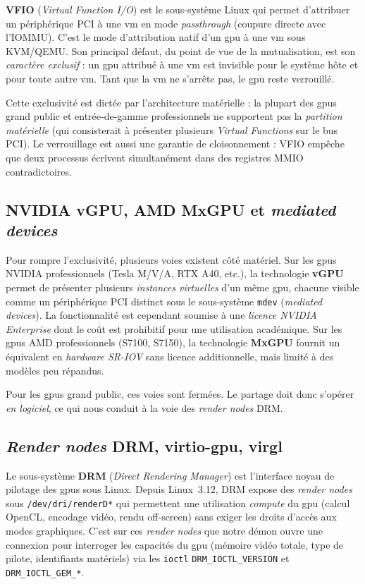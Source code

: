 \textbf{VFIO} (\emph{Virtual Function I/O}) est le sous-système Linux qui permet d'attribuer un périphérique PCI à une \acrshort{vm} en mode \emph{passthrough} (\og{}coupure\fg{} directe avec l'IOMMU). C'est le mode d'attribution natif d'un \acrshort{gpu} à une \acrshort{vm} sous KVM/QEMU. Son principal défaut, du point de vue de la mutualisation, est son \emph{caractère exclusif} : un \acrshort{gpu} attribué à une \acrshort{vm} est invisible pour le système hôte et pour toute autre \acrshort{vm}. Tant que la \acrshort{vm} ne s'arrête pas, le \acrshort{gpu} reste verrouillé.

Cette exclusivité est dictée par l'architecture matérielle : la plupart des \acrshort{gpu}s grand public et entrée-de-gamme professionnels ne supportent pas la \emph{partition matérielle} (qui consisterait à présenter plusieurs \emph{Virtual Functions} sur le bus PCI). Le verrouillage est aussi une garantie de cloisonnement : VFIO empêche que deux processus écrivent simultanément dans des registres MMIO contradictoires.

\subsection{NVIDIA vGPU, AMD MxGPU et \emph{mediated devices}}

Pour rompre l'exclusivité, plusieurs voies existent côté matériel. Sur les \acrshort{gpu}s NVIDIA professionnels (Tesla M/V/A, RTX A40, etc.), la technologie \textbf{vGPU} permet de présenter plusieurs \emph{instances virtuelles} d'un même \acrshort{gpu}, chacune visible comme un périphérique PCI distinct sous le sous-système \texttt{mdev} (\emph{mediated devices}). La fonctionnalité est cependant soumise à une \emph{licence NVIDIA Enterprise} dont le coût est prohibitif pour une utilisation académique. Sur les \acrshort{gpu}s AMD professionnels (S7100, S7150), la technologie \textbf{MxGPU} fournit un équivalent en \emph{hardware SR-IOV} sans licence additionnelle, mais limité à des modèles peu répandus.

Pour les \acrshort{gpu}s grand public, ces voies sont fermées. Le partage doit donc s'opérer \emph{en logiciel}, ce qui nous conduit à la voie des \emph{render nodes} DRM.

\subsection{\emph{Render nodes} DRM, virtio-gpu, virgl}

Le sous-système \textbf{DRM} (\emph{Direct Rendering Manager}) est l'interface noyau de pilotage des \acrshort{gpu}s sous Linux. Depuis Linux~3.12, DRM expose des \emph{render nodes} sous \texttt{/dev/dri/renderD*} qui permettent une utilisation \emph{compute} du \acrshort{gpu} (calcul OpenCL, encodage vidéo, rendu off-screen) sans exiger les droits d'accès aux modes graphiques. C'est sur ces \emph{render nodes} que notre démon ouvre une connexion pour interroger les capacités du \acrshort{gpu} (mémoire vidéo totale, type de pilote, identifiants matériels) via les \texttt{ioctl} \texttt{DRM\_IOCTL\_VERSION} et \texttt{DRM\_IOCTL\_GEM\_*}.

